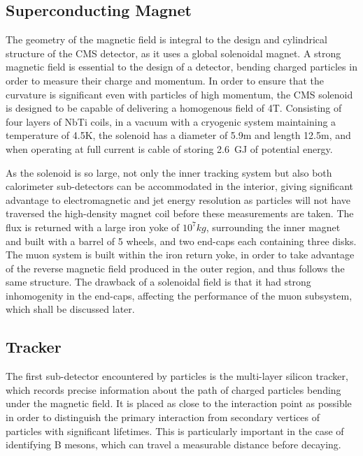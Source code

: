 \subsection{Superconducting Magnet}

The geometry of the magnetic field is integral to the design and cylindrical structure of the CMS detector, as it uses a global solenoidal magnet. A strong magnetic field is essential to the design of a detector, bending charged particles in order to measure their charge and momentum. In order to ensure that the curvature is significant even with particles of high momentum, the CMS solenoid is designed to be capable of delivering a homogenous field of 4T. Consisting of four layers of NbTi coils, in a vacuum with a cryogenic system maintaining a temperature of 4.5K, the solenoid has a diameter of 5.9m and length 12.5m, and when operating at full current is cable of storing 2.6~GJ of potential energy.

As the solenoid is so large, not only the inner tracking system but also both calorimeter sub-detectors can be accommodated in the interior, giving significant advantage to electromagnetic and jet energy resolution as particles will not have traversed the high-density magnet coil before these measurements are taken. The flux is returned with a large iron yoke of $10^{7}kg$, surrounding the inner magnet and built with a barrel of 5 wheels, and two end-caps each containing three disks. The muon system is built within the iron return yoke, in order to take advantage of the reverse magnetic field produced in the outer region, and thus follows the same structure. The drawback of a solenoidal field is that it had strong inhomogenity in the end-caps, affecting the performance of the muon subsystem, which shall be discussed later.


\subsection{Tracker}



The first sub-detector encountered by particles is the multi-layer silicon tracker, which records precise information about the path of charged particles bending under the magnetic field. It is placed as close to the interaction point as possible in order to distinguish the primary interaction from secondary vertices of particles with significant lifetimes. This is particularly important in the case of identifying B mesons, which can travel a measurable distance before decaying.  

